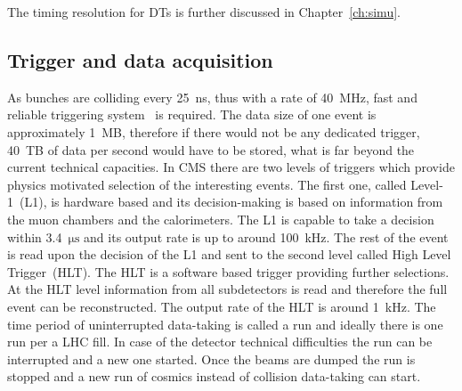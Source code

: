 \begin{description}
The timing resolution for DTs is further discussed in Chapter~\ref{ch:simu}.


\end{description}

\subsection{Trigger and data acquisition}

As bunches are colliding every 25~ns, thus with a rate of 40~MHz, fast and reliable triggering system~\cite{Khachatryan:2016bia} is required. The data size of one event is approximately 1~MB, therefore if there would not be any dedicated trigger, 40~TB of data per second would have to be stored, what is far beyond the current technical capacities. In CMS there are two levels of triggers which provide physics motivated selection of the interesting events. The first one, called Level-1~(L1), is hardware based and its decision-making is based on information from the muon chambers and the calorimeters. The L1 is capable to take a decision within 3.4~$\mathrm{\mu s}$ and its output rate is up to around 100~kHz. The rest of the event is read upon the decision of the L1 and sent to the second level called High Level Trigger~(HLT). The HLT is a software based trigger providing further selections. At the HLT level information from all subdetectors is read and therefore the full event can be reconstructed. The output rate of the HLT is around 1~kHz. The time period of uninterrupted data-taking is called a run and ideally there is one run per a LHC fill. In case of the detector technical difficulties the run can be interrupted and a new one started. Once the beams are dumped the run is stopped and a new run of cosmics instead of collision data-taking can start.


